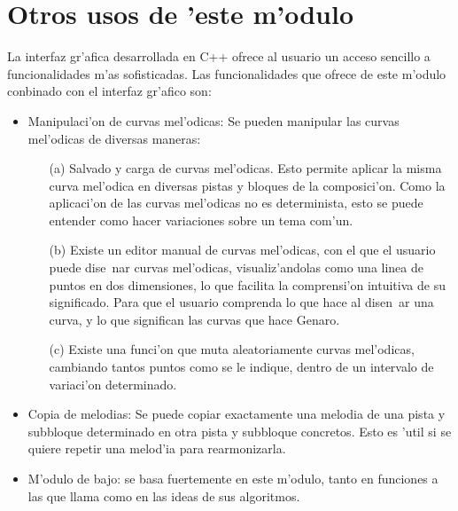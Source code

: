 \section {Otros usos de 'este m'odulo}
La interfaz gr'afica desarrollada en C++ ofrece al usuario un acceso sencillo a funcionalidades m'as sofisticadas. Las funcionalidades que ofrece de este m'odulo conbinado con el interfaz gr'afico son:
	\begin{itemize}
	\item Manipulaci'on de curvas mel'odicas: Se pueden manipular las curvas mel'odicas de diversas maneras:
		\begin{enumerate}
		\item[(a)] Salvado y carga de curvas mel'odicas. Esto permite aplicar la misma curva mel'odica en diversas pistas y bloques de la composici'on. Como la aplicaci'on de las curvas mel'odicas no es determinista, esto se puede entender como hacer variaciones sobre un tema com'un.
		\item[(b)] Existe un editor manual de curvas mel'odicas, con el que el usuario puede dise~nar curvas mel'odicas, visualiz'andolas como una linea de puntos en dos dimensiones, lo que facilita la comprensi'on intuitiva de su significado. Para que el usuario comprenda lo que hace al disen~ar una curva, y lo que significan las curvas que hace Genaro.
		\item[(c)] Existe una funci'on que muta aleatoriamente curvas mel'odicas, cambiando tantos puntos como se le indique, dentro de un intervalo de variaci'on determinado.
	\end{enumerate}
	\item Copia de melodias: Se puede copiar exactamente una melodia de una pista y subbloque determinado en otra pista y subbloque concretos. Esto es 'util si se quiere repetir una melod'ia para rearmonizarla.
	\item M'odulo de bajo: se basa fuertemente en este m'odulo, tanto en funciones a las que llama como en las ideas de sus algoritmos.
	\end{itemize}

